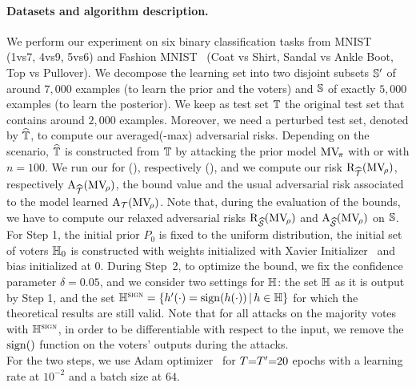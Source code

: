 \paragraph{Datasets and algorithm description.} We perform our experiment on six binary classification tasks from 
MNIST~\citep{LeCunCortesBurges1998} (1vs7, 4vs9, 5vs6) and Fashion MNIST~\citep{XiaoRasulVollgraf2017} (Coat vs Shirt, Sandal vs Ankle Boot, Top vs Pullover).
We decompose the learning set into two disjoint subsets $\S'$ of around $7,000$ examples (to learn the prior and the voters) and $\S$ of exactly $5,000$ examples (to learn the posterior).
We keep as test set $\T$ the original test set that contains around $2,000$ examples.
Moreover, we need a perturbed test set, denoted by $\Tpert$, to compute our \mbox{averaged(-max)} adversarial risks.
Depending on the scenario, $\Tpert$ is constructed from $\T$ by attacking the prior model $\MVP$ with \PGDU or \IFGSMU with $n{=}100$.
We run our  for  (), respectively  (), and we compute our risk $\Risk_{\dTpert}(\MVQ)$, respectively $\RiskM_{\dTpert}(\MVQ)$, the bound value and the usual adversarial risk associated to the model learned $\RiskA_{\dT}(\MVQ)$.
Note that, during the evaluation of the bounds, we have to compute our relaxed adversarial risks $\Risk_{\dSpert}(\MVQ)$ and $\RiskM_{\dSpert}(\MVQ)$ on $\S$.
For Step 1, the initial prior $P_0$ is fixed to the uniform distribution, the initial set of voters $\H_0$ is constructed with weights initialized with Xavier Initializer~\citep{GlorotBengio2010} and bias initialized at $0$.
During Step~2, to optimize the bound, we fix the confidence parameter $\delta{=}0.05$, and we consider two settings for $\H$: the set $\H$ as it is output by Step 1, and the set $\Hsigned=\{ h'(\cdot)=\sign(\h(\cdot))\,|\, \h\in\H\}$ for which the theoretical results are still valid.
Note that for all attacks on the majority votes with $\Hsigned$, in order to be differentiable with respect to the input, we remove the $\sign()$ function on the voters' outputs during the attacks.\\
For the two steps, we use Adam optimizer~\citep{KingmaBa2015} for $\iter{=}\iter'{=}20$ epochs with a learning rate at $10^{-2}$ and a batch size at $64$.


